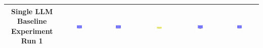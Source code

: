 \begin{table}[H]
\begin{tabular}{|c|c|c|c|c|c|}
    Single LLM Baseline Experiment Run 1 & \includegraphics[width=0.15\textwidth]{./run_1/png/gpt-4o_results/MicrofluidicChip.png} & \includegraphics[width=0.15\textwidth]{./run_1/png/claude-3-5-sonnet-20240620_results/MicrofluidicChip.png} & \includegraphics[width=0.15\textwidth]{./run_1/png/watsonx_meta-llama_llama-3-1-70b-instruct_results/MicrofluidicChip.png} & \includegraphics[width=0.15\textwidth]{./run_1/png/watsonx_meta-llama_llama-3-405b-instruct_results/MicrofluidicChip.png} & \includegraphics[width=0.15\textwidth]{./run_1/png/o1-preview_results/MicrofluidicChip.png} \\
    \hline

\end{tabular}
\end{table}
